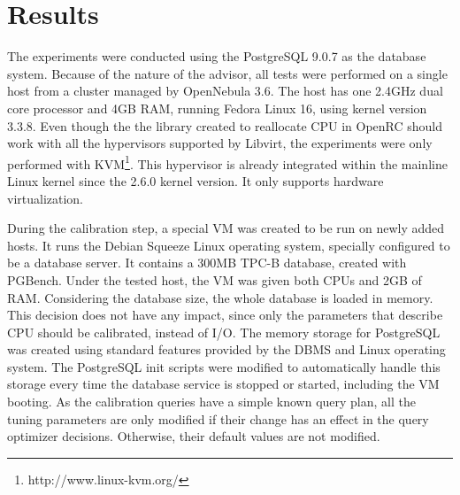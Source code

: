 \chapter{Results}

\label{chap:results}

The experiments were conducted using the PostgreSQL 9.0.7 as the database system. Because of the nature of the advisor, all tests were performed on a single host from a cluster managed by OpenNebula 3.6. The host has one 2.4GHz dual core processor and 4GB RAM, running Fedora Linux 16, using kernel version 3.3.8. Even though the the library created to reallocate CPU in OpenRC should work with all the hypervisors supported by Libvirt, the experiments were only performed with KVM\footnote{http://www.linux-kvm.org/}. This hypervisor is already integrated within the mainline Linux kernel since the 2.6.0 kernel version. It only supports hardware virtualization.

During the calibration step, a special VM was created to be run on newly added hosts. It runs the Debian Squeeze Linux operating system, specially configured to be a database server. It contains a 300MB TPC-B database, created with PGBench. Under the tested host, the VM was given both CPUs and 2GB of RAM. Considering the database size, the whole database is loaded in memory. This decision does not have any impact, since only the parameters that describe CPU should be calibrated, instead of I/O. The memory storage for PostgreSQL was created using standard features provided by the DBMS and Linux operating system. The PostgreSQL init scripts were modified to automatically handle this storage every time the database service is stopped or started, including the VM booting. As the calibration queries have a simple known query plan, all the tuning parameters are only modified if their change has an effect in the query optimizer decisions. Otherwise, their default values are not modified.

